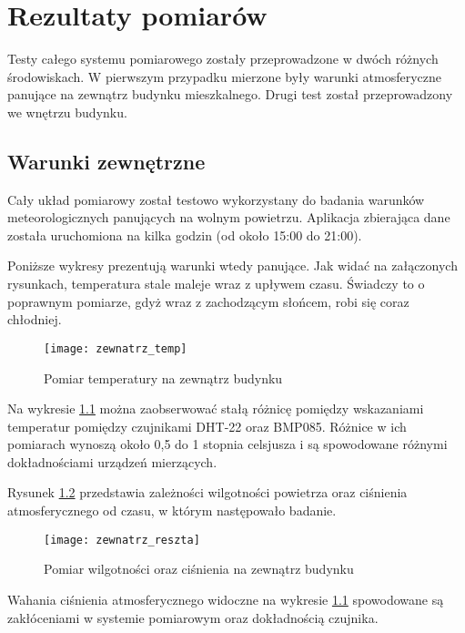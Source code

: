 \chapter{Rezultaty pomiarów}
Testy całego systemu pomiarowego zostały przeprowadzone w dwóch różnych środowiskach. W pierwszym przypadku mierzone były warunki atmosferyczne panujące na zewnątrz budynku mieszkalnego. Drugi test został przeprowadzony we wnętrzu budynku.
\section{Warunki zewnętrzne}
Cały układ pomiarowy został testowo wykorzystany do badania warunków  meteorologicznych panujących na wolnym powietrzu. Aplikacja zbierająca dane została uruchomiona na kilka godzin (od około 15:00 do 21:00).

Poniższe wykresy prezentują warunki wtedy panujące. Jak widać na załączonych rysunkach, temperatura stale maleje wraz z upływem czasu. Świadczy to o poprawnym pomiarze, gdyż wraz z zachodzącym słońcem, robi się coraz chłodniej.
\begin{figure}[h!]
\centering
\texttt{[image: zewnatrz\_temp]}
\caption{Pomiar temperatury na zewnątrz budynku}
\label{fig:zewnatrz_temp}
\end{figure}

Na wykresie \ref{fig:zewnatrz_temp} można zaobserwować stałą różnicę pomiędzy wskazaniami temperatur pomiędzy czujnikami DHT-22 oraz BMP085. Różnice w ich pomiarach wynoszą około 0,5 do 1 stopnia celsjusza i są spowodowane różnymi dokładnościami urządzeń mierzących.

Rysunek \ref{fig:zewnatrz_reszta} przedstawia zależności wilgotności powietrza oraz ciśnienia atmosferycznego od czasu, w którym następowało badanie.
\begin{figure}[h!]
\centering
\texttt{[image: zewnatrz\_reszta]}
\caption{Pomiar wilgotności oraz ciśnienia na zewnątrz budynku}
\label{fig:zewnatrz_reszta}
\end{figure}

Wahania ciśnienia atmosferycznego widoczne na wykresie \ref{fig:zewnatrz_temp} spowodowane są zakłóceniami w systemie pomiarowym oraz dokładnością czujnika.


